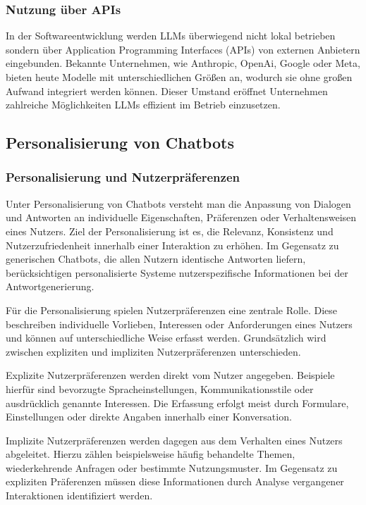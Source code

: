 \subsubsection{Nutzung über APIs}

In der Softwareentwicklung werden LLMs überwiegend nicht lokal betrieben sondern über Application Programming Interfaces (APIs) von externen Anbietern eingebunden. Bekannte Unternehmen, wie Anthropic, OpenAi, Google oder Meta, bieten heute Modelle mit unterschiedlichen Größen an, wodurch sie ohne großen Aufwand integriert werden können. Dieser Umstand eröffnet Unternehmen zahlreiche Möglichkeiten LLMs effizient im Betrieb einzusetzen.


\subsection{Personalisierung von Chatbots}

\subsubsection{Personalisierung und Nutzerpräferenzen}

Unter Personalisierung von Chatbots versteht man die Anpassung von Dialogen und Antworten an individuelle Eigenschaften, Präferenzen oder Verhaltensweisen eines Nutzers. Ziel der Personalisierung ist es, die Relevanz, Konsistenz und Nutzerzufriedenheit innerhalb einer Interaktion zu erhöhen. Im Gegensatz zu generischen Chatbots, die allen Nutzern identische Antworten liefern, berücksichtigen personalisierte Systeme nutzerspezifische Informationen bei der Antwortgenerierung.

Für die Personalisierung spielen Nutzerpräferenzen eine zentrale Rolle. Diese beschreiben individuelle Vorlieben, Interessen oder Anforderungen eines Nutzers und können auf unterschiedliche Weise erfasst werden. Grundsätzlich wird zwischen expliziten und impliziten Nutzerpräferenzen unterschieden.

Explizite Nutzerpräferenzen werden direkt vom Nutzer angegeben. Beispiele hierfür sind bevorzugte Spracheinstellungen, Kommunikationsstile oder ausdrücklich genannte Interessen. Die Erfassung erfolgt meist durch Formulare, Einstellungen oder direkte Angaben innerhalb einer Konversation.

Implizite Nutzerpräferenzen werden dagegen aus dem Verhalten eines Nutzers abgeleitet. Hierzu zählen beispielsweise häufig behandelte Themen, wiederkehrende Anfragen oder bestimmte Nutzungsmuster. Im Gegensatz zu expliziten Präferenzen müssen diese Informationen durch Analyse vergangener Interaktionen identifiziert werden.

